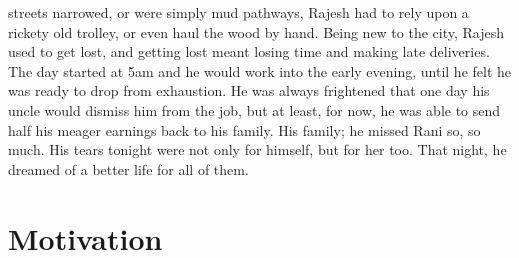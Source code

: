 \documentclass[a5paper,english,openany]{memoir}
\begin{document}
streets narrowed, or were simply mud pathways, Rajesh had to rely upon a rickety old trolley, or even haul the wood by hand. Being new to the city, Rajesh used to get lost, and getting lost meant losing time and making late deliveries. The day started at 5am and he would work into the early evening, until he felt he was ready to drop from exhaustion. He was always frightened that one day his uncle would dismiss him from the job, but at least, for now, he was able to send half his meager earnings back to his family. His family; he missed Rani so, so much. His tears tonight were not only for himself, but for her too. That night, he dreamed of a better life for all of them.

\chapter*{Motivation}{\label{ch:intro}}
\end{document}
